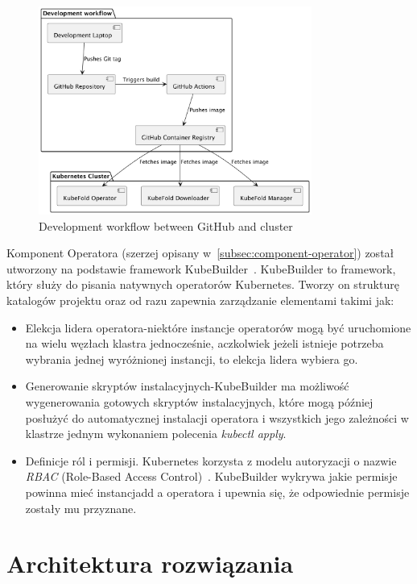 \begin{figure}[htbp]
    \centering
    \includegraphics[width=0.8\textwidth]{images/images}
    \caption{Development workflow between GitHub and cluster}
    \label{fig:docker-images-flow}
\end{figure}

Komponent Operatora (szerzej opisany w~\ref{subsec:component-operator}) został utworzony na podstawie framework KubeBuilder~\cite{kubebuilder}.
KubeBuilder to framework, który służy do pisania natywnych operatorów Kubernetes.
Tworzy on strukturę katalogów projektu oraz od razu zapewnia zarządzanie elementami takimi jak:
\begin{itemize}
    \item Elekcja lidera operatora-niektóre instancje operatorów mogą być uruchomione na wielu węzłach klastra jednocześnie, aczkolwiek jeżeli istnieje potrzeba wybrania jednej wyróżnionej instancji, to elekcja lidera wybiera go.
    \item Generowanie skryptów instalacyjnych-KubeBuilder ma możliwość wygenerowania gotowych skryptów instalacyjnych, które mogą później posłużyć do automatycznej instalacji operatora i wszystkich jego zależności w klastrze jednym wykonaniem polecenia \textit{kubectl apply}.
    \item Definicje ról i permisji.
    Kubernetes korzysta z modelu autoryzacji o nazwie \textit{RBAC} (Role-Based Access Control)~\cite{k8s_rbac}.
    KubeBuilder wykrywa jakie permisje powinna mieć instancjadd a operatora i upewnia się, że odpowiednie permisje zostały mu przyznane.
\end{itemize}


\section{Architektura rozwiązania}


